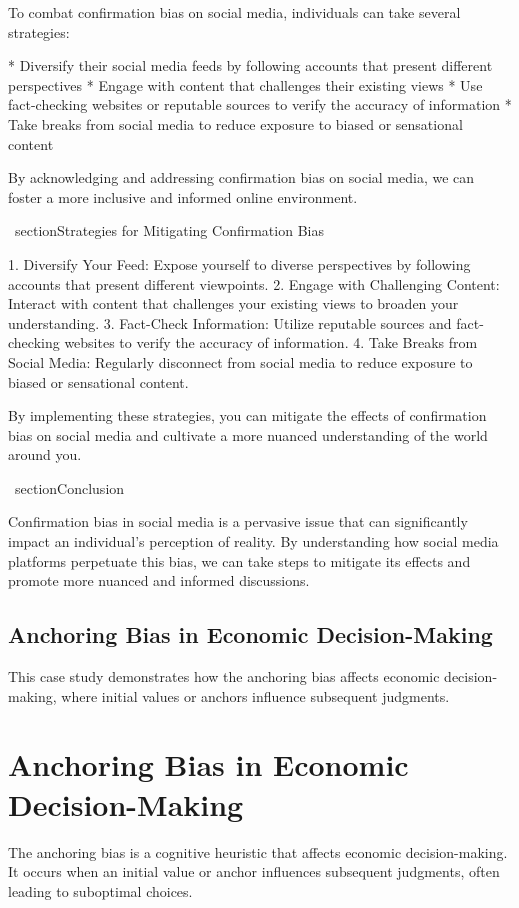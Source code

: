 \documentclass{report}%
\begin{document}
{{{To combat confirmation bias on social media, individuals can take several strategies:

*   Diversify their social media feeds by following accounts that present different perspectives
*   Engage with content that challenges their existing views
*   Use fact-checking websites or reputable sources to verify the accuracy of information
*   Take breaks from social media to reduce exposure to biased or sensational content

By acknowledging and addressing confirmation bias on social media, we can foster a more inclusive and informed online environment.

\ section{Strategies for Mitigating Confirmation Bias}

1.  Diversify Your Feed: Expose yourself to diverse perspectives by following accounts that present different viewpoints.
2.  Engage with Challenging Content: Interact with content that challenges your existing views to broaden your understanding.
3.  Fact-Check Information: Utilize reputable sources and fact-checking websites to verify the accuracy of information.
4.  Take Breaks from Social Media: Regularly disconnect from social media to reduce exposure to biased or sensational content.

By implementing these strategies, you can mitigate the effects of confirmation bias on social media and cultivate a more nuanced understanding of the world around you.

\ section{Conclusion}

Confirmation bias in social media is a pervasive issue that can significantly impact an individual's perception of reality. By understanding how social media platforms perpetuate this bias, we can take steps to mitigate its effects and promote more nuanced and informed discussions.%
\section{Anchoring Bias in Economic Decision{-}Making}%
This case study demonstrates how the anchoring bias affects economic decision-making, where initial values or anchors influence subsequent judgments.

%
\chapter{Anchoring Bias in Economic Decision-Making}

The anchoring bias is a cognitive heuristic that affects economic decision-making. It occurs when an initial value or anchor influences subsequent judgments, often leading to suboptimal choices.

}}}
\end{document}

